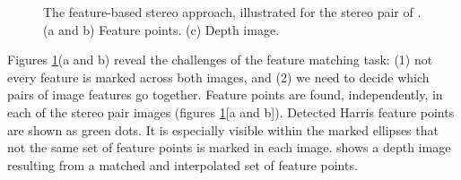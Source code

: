 \begin{figure}[h]
\centerline{
}
\caption{The feature-based stereo approach, illustrated for the stereo pair of \fig{\ref{fig:stereomatch}}. (a and b) Feature points. (c) Depth image.
}
\label{fig:stereopoints}
\end{figure}

Figures \ref{fig:stereopoints}(a and b) reveal the challenges of the feature matching task:  (1) not every feature is marked across both images, and (2) we need to decide which pairs of image features go together.  Feature points are found, independently, in each of the stereo pair images (figures \ref{fig:stereopoints}[a and b]).  Detected Harris feature points \cite{Harris88} are shown as green dots. It is especially visible within the marked ellipses that not the same set of feature points is marked in each image.   shows a depth image resulting from a matched and interpolated set of feature points.


